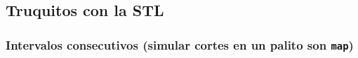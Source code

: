 \subsection{Truquitos con la STL}
    

    \subsubsection{Intervalos consecutivos (simular cortes en un palito son \texttt{map})}
    
